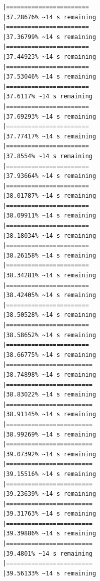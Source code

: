 \documentclass{article}\usepackage[]{graphicx}\usepackage[]{xcolor}
\makeatletter
\newenvironment{kframe}{%
 \def\at@end@of@kframe{}%
 \ifinner\ifhmode%
  \def\at@end@of@kframe{\end{minipage}}%
  \begin{minipage}{\columnwidth}%
 \fi\fi%
 \def\FrameCommand##1{\hskip\@totalleftmargin \hskip-\fboxsep
 \colorbox{shadecolor}{##1}\hskip-\fboxsep
     \hskip-\linewidth \hskip-\@totalleftmargin \hskip\columnwidth}%
 \MakeFramed {\advance\hsize-\width
   \@totalleftmargin\z@ \linewidth\hsize
   \@setminipage}}%
 {\par\unskip\endMakeFramed%
 \at@end@of@kframe}
\newenvironment{knitrout}{}{} %
\makeatother
\begin{document}
\begin{knitrout}
\begin{kframe}
\begin{verbatim}
|=======================                                       |37.28676% ~14 s remaining 
|=======================                                       |37.36799% ~14 s remaining 
|=======================                                       |37.44923% ~14 s remaining 
|=======================                                       |37.53046% ~14 s remaining 
|=======================                                       |37.6117% ~14 s remaining  
|=======================                                       |37.69293% ~14 s remaining 
|=======================                                       |37.77417% ~14 s remaining 
|=======================                                       |37.8554% ~14 s remaining  
|=======================                                       |37.93664% ~14 s remaining 
|=======================                                       |38.01787% ~14 s remaining 
|=======================                                       |38.09911% ~14 s remaining 
|=======================                                       |38.18034% ~14 s remaining 
|=======================                                       |38.26158% ~14 s remaining 
|=======================                                       |38.34281% ~14 s remaining 
|=======================                                       |38.42405% ~14 s remaining 
|=======================                                       |38.50528% ~14 s remaining 
|=======================                                       |38.58652% ~14 s remaining 
|=======================                                       |38.66775% ~14 s remaining 
|========================                                      |38.74898% ~14 s remaining 
|========================                                      |38.83022% ~14 s remaining 
|========================                                      |38.91145% ~14 s remaining 
|========================                                      |38.99269% ~14 s remaining 
|========================                                      |39.07392% ~14 s remaining 
|========================                                      |39.15516% ~14 s remaining 
|========================                                      |39.23639% ~14 s remaining 
|========================                                      |39.31763% ~14 s remaining 
|========================                                      |39.39886% ~14 s remaining 
|========================                                      |39.4801% ~14 s remaining  
|========================                                      |39.56133% ~14 s remaining 

\end{verbatim}
\end{kframe}
\end{knitrout}
\end{document}
